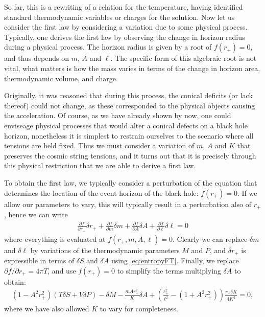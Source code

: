 \documentclass[
twoside,
openright,
frontopenright,
]{dmathesis}
\begin{document}
So far, this is a rewriting of a relation for the temperature, having identified
standard thermodynamic variables or charges for the solution. Now let us
consider the first law by considering a variation due to some physical process.
Typically, one derives the first law by observing the change in horizon radius
during a physical process. The horizon radius is given by a root of $f(r_+)=0$,
and thus depends on $m$, $A$ and $\ell$. The specific form of this
algebraic root is not vital, what matters is how the mass varies in terms of the
change in horizon area, thermodynamic volume, and charge.

Originally, it was reasoned that during this process, the conical deficits (or
lack thereof) could not change, as these corresponded to the physical objects
causing the acceleration. Of course, as we have already shown by now, one could
enviseage physical processes that would alter a conical defects on a black hole
horizon, nonetheless it is simplest to restrain ourselves to the scenario where
all tensions are held fixed. Thus we must consider a variation of $m$, $A$ and
$K$ that preserves the cosmic string tensions, and it turns out that it is
precisely through this physical restriction that we are able to derive a first
law.

To obtain the first law, we typically consider a perturbation of the equation
that determines the location of the event horizon of the black hole:
$f(r_+)=0$. If we allow our parameters to vary, this will typically result in a
perturbation also of $r_+$, hence we can write
\begin{align}
\frac{\partial f}{\partial r_+} \delta r_+ +
\frac{\partial f}{\partial m} \delta m +
\frac{\partial f}{\partial A} \delta A +
\frac{\partial f}{\partial \ell} \delta \ell =0
\end{align}
where everything is evaluated at $f(r_+, m,A, \ell)=0$.  Clearly we can replace
$\delta m$ and $\delta \ell$ by variations of the thermodynamic parameters $M$
and $P$, and $\delta r_+$ is expressible in terms of $\delta S$ and $\delta A$
using \cref{eq:entropyFT}. Finally, we replace
$\partial f /\partial r_+ = 4 \pi T$, and use $f(r_+)=0$ to simplify the terms
multiplying $\delta A$ to obtain:
\begin{align}
(1-A^2 r_+^2) (T \delta S + V \delta P) - \delta M - \frac{m A r_+^2}{K} \delta
  A + \left(\frac{r_+^2}{\ell^2}-(1+A^2r_+^2)\right)\frac{r_+\delta K}{4K^2}  =0,
\label{eq:firstint}
\end{align}
where we have also allowed $K$ to vary for completeness.
\end{document}
